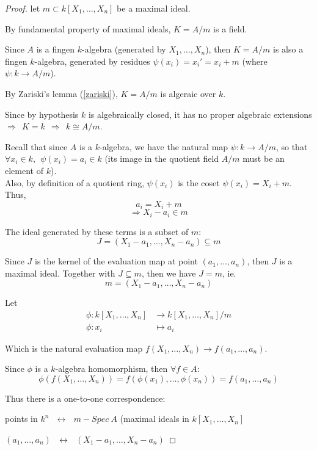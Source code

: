 \documentclass{article}
\theoremstyle{definition}
\begin{document}
\begin{proof}
  let $m \subset k[X_1, \ldots, X_n]$ be a maximal ideal.

  By fundamental property of maximal ideals, $K=A/m$ is a field.

  Since $A$ is a fingen $k$-algebra (generated by $X_1, \ldots, X_n$), then $K=A/m$ is also a fingen $k$-algebra, generated by residues $\psi(x_i) = x_i' = x_i +m$ (where $\psi: k \longrightarrow A/m$).

  By Zariski's lemma (\ref{zariski}), $K=A/m$ is algeraic over $k$.

  Since by hypothesis $k$ is algebraically closed, it has no proper algebraic extensions\\
  \hspace*{2em} $\Longrightarrow~~ K=k~~ \Longrightarrow~~ k \cong A/m$.
  
  \vspace{0.3cm}
  Recall that since $A$ is a $k$-algebra, we have the natural map $\psi: k \longrightarrow A/m$, so that $\forall x_i \in k,~~\psi(x_i)=a_i \in k$ (its image in the quotient field $A/m$ must be an element of $k$).\\
  Also, by definition of a quotient ring, $\psi(x_i)$ is the coset $\psi(x_i)=X_i +m$.
  Thus,
  $$a_i = X_i +m$$
  $$\Longrightarrow X_i - a_i \in m$$

  The ideal generated by these terms is a subset of $m$:
  $$J=(X_1 -a_1, \ldots, X_n -a_n) \subseteq m$$

  Since $J$ is the kernel of the evaluation map at point $(a_1, \ldots, a_n)$,
  then $J$ is a maximal ideal. Together with $J \subseteq m$, then we have
  $J=m$, ie. $$m = (X_1 -a_1, \ldots, X_n -a_n)$$

  \vspace{0.3cm}
  Let
  \begin{align*}
    \phi: k[X_1, \ldots, X_n] &\longrightarrow k[X_1, \ldots, X_n]/m\\
    \phi: x_i &\longmapsto a_i
  \end{align*}

  Which is the natural evaluation map $f(X_1, \ldots, X_n) \longrightarrow f(a_1, \ldots, a_n)$.
  \vspace{0.2cm}

  Since $\phi$ is a $k$-algebra homomorphism, then $\forall f \in A$:
  $$\phi(f(X_1, \ldots, X_n)) = f(\phi(x_1), \ldots, \phi(x_n))= f(a_1, \ldots, a_n)$$

  Thus there is a one-to-one correspondence:

  points in $k^n ~~~ \longleftrightarrow~~~ m-Spec~ A$ (maximal ideals in $k[X_1, \ldots, X_n]$

  $(a_1, \ldots, a_n) ~~~\longleftrightarrow~~~ (X_1 - a_1, \ldots, X_n - a_n)$
\end{proof}
\end{document}
